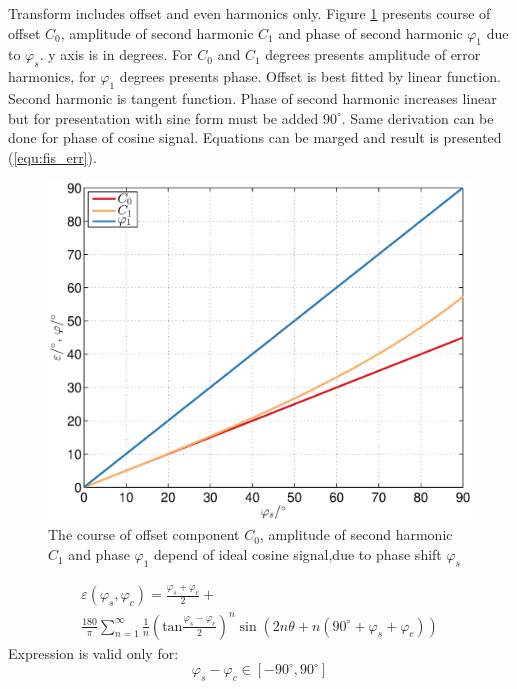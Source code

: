 \documentclass[a4paper]{article}
\begin{document}
Transform includes offset and even harmonics only. Figure  \ref{fig:fis} presents course of offset $C_0$, amplitude of second harmonic $C_1$ and phase    of second harmonic $\varphi_{1}$ due to $\varphi_s$. y axis is in degrees. For $C_0$ and $C_1$ degrees presents amplitude of error harmonics, for $\varphi_{1}$ degrees presents phase. Offset is best fitted by linear function. Second harmonic is tangent function. Phase of second harmonic increases linear but for presentation with sine form must be added $90^\circ$. Same derivation can be done for phase of cosine signal. Equations can be marged and result is presented (\ref{equ:fis_err}).
\begin{figure}[!htb]
	\begin{center}
		\includegraphics[width=\linewidth]{./Slike/fis.eps}
		\caption{The course of offset component $C_0$, amplitude of second harmonic  $C_1$ and phase $\varphi_1$ depend of ideal cosine signal,due to phase shift $\varphi_{s}$} \label{fig:fis}
	\end{center}
\end{figure}
\begin{multline}
\label{equ:fis_err}
\varepsilon(\varphi_{s},\varphi_{c}) = \frac{\varphi_{s}+\varphi_{c}}{2}+\\ \frac{180}{\pi}\sum_{n=1}^{\infty}\frac{1}{n} (\mathrm{tan}\frac{\varphi_{s}-\varphi_{c}}{2})^n \sin (2n \theta+n(90^\circ +\varphi_{s}+\varphi_{c}))
\end{multline}
Expression is valid only for:
$$ \varphi_{s}-\varphi_{c} \in [ -90^\circ , 90^\circ ] $$
\end{document}
